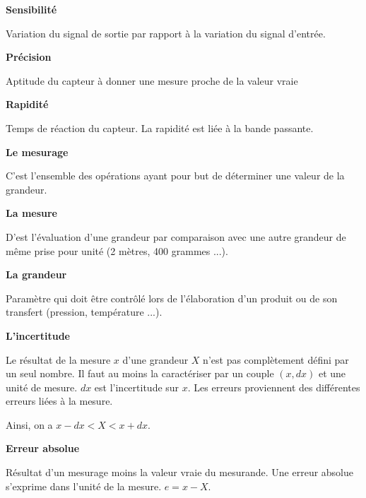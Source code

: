 \documentclass[10pt]{article}
\begin{document}
\begin{defi}
\textbf{Sensibilité}

Variation du signal de sortie par rapport à la variation du signal d'entrée.
\end{defi}


\begin{defi}
\textbf{Précision}

Aptitude du capteur à donner une mesure proche de la valeur vraie
\end{defi}

\begin{defi}
\textbf{Rapidité}

Temps de réaction du capteur. La rapidité est liée à la bande passante.
\end{defi}

\begin{defi}
\textbf{Le mesurage}

C'est l'ensemble des opérations ayant pour but de déterminer une valeur de la grandeur.
\end{defi}

\begin{defi}
\textbf{La mesure}

D'est l'évaluation d'une grandeur par comparaison avec une autre grandeur de même prise pour unité (2 mètres, 400 grammes ...).
\end{defi}

\begin{defi}
\textbf{La grandeur}

Paramètre qui doit être contrôlé lors de l'élaboration d'un produit ou de son transfert (pression, température ...). 
\end{defi}

\begin{defi}
\textbf{L'incertitude}

Le résultat de la mesure $x$ d'une grandeur $X$ n'est pas complètement défini par un seul nombre. Il faut au moins la caractériser par un couple $(x,dx)$ et une unité de mesure. $dx$ est l'incertitude sur $x$. Les erreurs proviennent des différentes erreurs liées à la mesure. 

Ainsi, on a $x-dx<X<x+dx$.
\end{defi}

\begin{defi}
\textbf{Erreur absolue}

Résultat d'un mesurage moins la valeur vraie du mesurande. Une erreur absolue s'exprime dans l'unité de la mesure. $e=x-X$.  
\end{defi}
\end{document}
